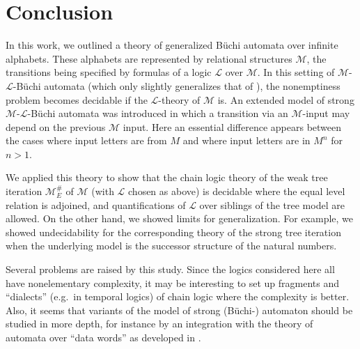 \documentclass[copyright,creativecommons]{eptcs}
\theoremstyle{plain}
\theoremstyle{nonumberplain}
\newcommand{\m}{\ensuremath{\mathcal{M}}}
\newcommand{\el}{\ensuremath{\mathcal{L}}}
\newcommand{\MweakE}{\ensuremath{\m^{\#}_E}}
\begin{document}
\section{Conclusion}\label{sec_con}



In this work, we outlined a theory of generalized B\"uchi automata 
over infinite alphabets. These alphabets are represented by relational structures 
$\m$, the transitions being specified by formulas of a logic $\el$ over $\m$. 
In this setting of $\m$-$\el$-B\"uchi automata (which only slightly generalizes 
that of \cite{bes08}), the nonemptiness problem becomes decidable if the $\el$-theory 
of $\m$ is. An extended model of strong $\m$-$\el$-B\"uchi automata was introduced 
in which a transition via an $\m$-input may depend on the previous $\m$ input. Here 
an essential difference appears between the cases where input letters are from $M$ 
and where  input letters are in $M^n$ for $n> 1$. 

We applied this theory to show that the chain logic theory of the weak tree 
iteration $\MweakE$ of $\m$ (with $\el$ chosen as above) 
is decidable where the equal level relation is adjoined, and quantifications 
of $\el$ over siblings of the tree model are allowed. On the other hand, we showed limits 
for generalization. For example, we showed undecidability 
for the corresponding theory of the strong tree iteration when the underlying 
model is the successor structure of the natural numbers.  

Several problems are raised by this study. Since the logics considered here all 
have nonelementary complexity, it may be interesting to set up fragments and ``dialects''
(e.g.\ in temporal logics) of chain logic where the complexity is better. 
Also, it seems that variants of the model of strong (B\"uchi-) automaton 
should be studied in more depth, for instance by an integration with the 
theory of automata over ``data words'' as developed in \cite{nsv04,bmssd,cg09}.










\end{document}
